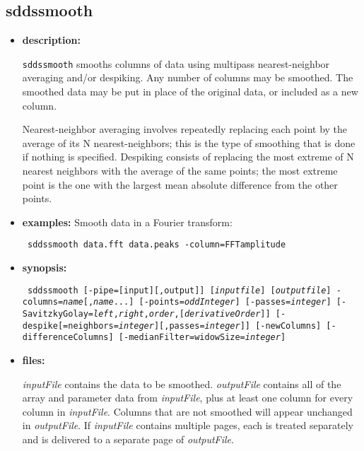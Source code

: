 \newpage
\subsection{sddssmooth}
\label{sddssmooth}

\begin{itemize}
\item {\bf description:}

{\tt sddssmooth} smooths columns of data using multipass nearest-neighbor averaging and/or
despiking.  Any number of columns may be smoothed.  The smoothed data may be put in place of the
original data, or included as a new column.

Nearest-neighbor averaging involves repeatedly replacing each point by the average of its
N nearest-neighbors; this is the type of smoothing that is done if nothing is specified.
Despiking consists of replacing the most extreme of N nearest neighbors with the average
of the same points; the most extreme point is the one with the largest mean absolute difference
from the other points.

\item {\bf examples:} 
Smooth data in a Fourier transform:
\begin{flushleft}{\tt
sddssmooth data.fft data.peaks -column=FFTamplitude 
}\end{flushleft}

\item {\bf synopsis:} 
\begin{flushleft}{\tt
sddssmooth [-pipe=[input][,output]] [{\em inputfile}] [{\em outputfile}] 
-columns={\em name}[,{\em name}...] 
[-points={\em oddInteger}] [-passes={\em integer}]
[-SavitzkyGolay={\em left},{\em right},{\em order},[{\em derivativeOrder}]]
[-despike[=neighbors={\em integer}][,passes={\em integer}]]
[-newColumns] [-differenceColumns] [-medianFilter=widowSize={\em integer}]
}\end{flushleft}
\item {\bf files:}

{\em inputFile} contains the data to be smoothed.  {\em outputFile} contains all of the array and
parameter data from {\em inputFile}, plus at least one column for every column in {\em inputFile}.
Columns that are not smoothed will appear unchanged in {\em outputFile}. If {\em inputFile}
contains multiple pages, each is treated separately and is delivered to a separate page of {\em
outputFile}.


\end{itemize}
